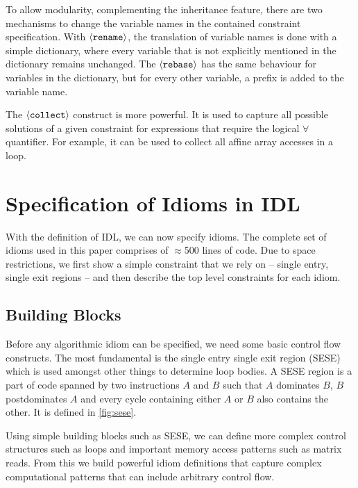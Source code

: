     To allow modularity, complementing the inheritance feature, there are two
    mechanisms to change the variable names in the contained constraint
    specification.
    With $\left<\text{\tt rename}\right>$, the translation of variable names is
    done with a simple dictionary, where every variable that is not explicitly
    mentioned in the dictionary remains unchanged.
    The $\left<\text{\tt rebase}\right>$ has the same behaviour for variables in
    the dictionary, but for every other variable, a prefix is added to the
    variable name.

    The $\left<\text{\tt collect}\right>$ construct is more powerful.
    It is used to capture all possible solutions of a given constraint for
    expressions that require the logical $\forall$ quantifier.
    For example, it can be used to collect all affine array accesses in a loop.

\section{Specification of Idioms in IDL}

With the definition of IDL, we can now specify idioms.
The complete set of idioms used in this paper comprises of $\approx$500 lines of code.
Due to space restrictions, we first show a simple constraint that we rely on --
single entry, single exit regions -- and then describe the top level
constraints for each idiom.

\subsection{Building Blocks}
Before any algorithmic idiom can be specified, we need some basic
control flow constructs.  The most fundamental is the single entry
single exit region (SESE) \cite{johnson1994program}
 which is used amongst other things to determine loop bodies.
A SESE region is a part of code spanned by two instructions $A$ and $B$ such that $A$ dominates $B$, $B$
postdominates $A$ and every cycle containing either $A$ or $B$ also contains the other. It is defined in \autoref{fig:sese}.

Using simple building blocks such as SESE, we can define more complex control structures such as loops and important memory access patterns such as matrix reads.
From this we build powerful idiom definitions that capture complex computational patterns that can include arbitrary control flow.

